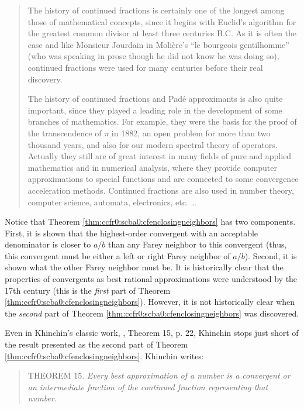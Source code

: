 \begin{quote}
The history of continued fractions is certainly one of the longest
among those of mathematical concepts, since it begins with
Euclid's algorithm  for the greatest common divisor at least
three centuries B.C.  As it is often the case and like
Monsieur Jourdain in Moli\`ere's ``le bourgeois gentilhomme''
(who was speaking in prose though he did not know he was doing so), 
continued fractions were used for many centuries before their real
discovery.

The history of continued fractions and Pad\'e approximants is also
quite important, since they played a leading role in the development
of some branches of mathematics.  For example, they were the basis
for the proof of the transcendence of $\pi$ in 1882, an open
problem for more than two thousand years, and also for our modern
spectral theory of operators.  Actually they still are of great
interest in many fields of pure and applied mathematics and in
numerical analysis, where they provide computer approximations to
special functions and are connected to some convergence acceleration
methods.  Continued fractions are also used in number theory,
computer science, automata, electronics, etc. \ldots{}
\end{quote}

Notice that Theorem \ref{thm:ccfr0:scba0:cfenclosingneighbors} 
has two components.  First, it is shown that the highest-order
convergent with an acceptable denominator is closer to $a/b$ than
any Farey neighbor to this convergent (thus, this convergent must be
either a left or right  Farey neighbor of $a/b$).  Second, it is shown
what the other Farey neighbor must be.  It is historically clear
that the properties of convergents as best rational approximations were
understood by the 17th century (this is the \emph{first} part of
Theorem \ref{thm:ccfr0:scba0:cfenclosingneighbors}).  However, it
is not historically clear when the \emph{second} part of
Theorem \ref{thm:ccfr0:scba0:cfenclosingneighbors} was discovered.

Even in Khinchin's  classic work, 
\cite{bibref:b:KhinchinClassic}, Theorem 15, p. 22, Khinchin stops
just short of the result presented as the second part of
Theorem \ref{thm:ccfr0:scba0:cfenclosingneighbors}.  Khinchin writes:

\begin{quote}
THEOREM 15.  \em Every best approximation of a number is a convergent
or an intermediate fraction of the continued fraction representing
that number.
\end{quote}

